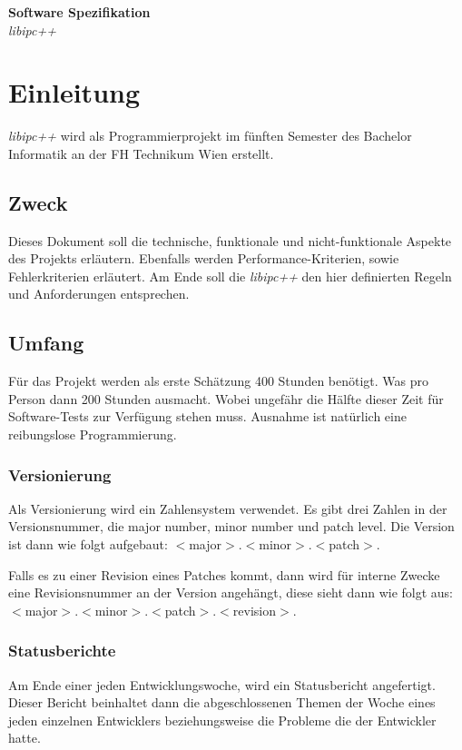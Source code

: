 \documentclass[a4paper]{book}
\begin{document}
\thispagestyle{empty}
\begin{center}
\huge
\textbf{Software Spezifikation}\\
\textit{libipc++}
\end{center}

\cleardoublepage
\tableofcontents
\cleardoublepage

\setcounter{page}{1}

\chapter{Einleitung}
\textit{libipc++} wird als Programmierprojekt im fünften Semester des Bachelor Informatik an der FH Technikum Wien erstellt.

\section{Zweck}
Dieses Dokument soll die technische, funktionale und nicht-funktionale Aspekte des Projekts erläutern. Ebenfalls werden Performance-Kriterien, sowie Fehlerkriterien erläutert. Am Ende soll die \textit{libipc++} den hier definierten Regeln und Anforderungen entsprechen.

\section{Umfang}
Für das Projekt werden als erste Schätzung 400 Stunden benötigt. Was pro Person dann 200 Stunden ausmacht. Wobei ungefähr die Hälfte dieser Zeit für Software-Tests zur Verfügung stehen muss. Ausnahme ist natürlich eine reibungslose Programmierung.

\subsection{Versionierung}
Als Versionierung wird ein Zahlensystem verwendet. Es gibt drei Zahlen in der Versionsnummer, die major number, minor number und patch level. Die Version ist dann wie folgt aufgebaut: $<$major$>$.$<$minor$>$.$<$patch$>$.\newline

\noindent Falls es zu einer Revision eines Patches kommt, dann wird für interne Zwecke eine Revisionsnummer an der Version angehängt, diese sieht dann wie folgt aus: $<$major$>$.$<$minor$>$.$<$patch$>$.$<$revision$>$.

\subsection{Statusberichte}
Am Ende einer jeden Entwicklungswoche, wird ein Statusbericht angefertigt. Dieser Bericht beinhaltet dann die abgeschlossenen Themen der Woche eines jeden einzelnen Entwicklers beziehungsweise die Probleme die der Entwickler hatte.\newline
\end{document}

